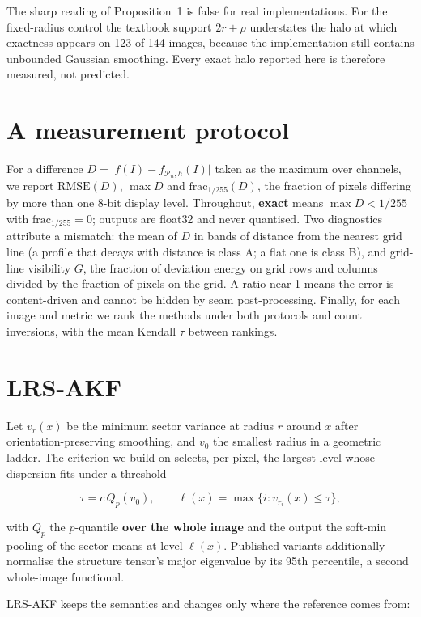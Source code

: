 \documentclass[journal]{IEEEtran}
\begin{document}
The sharp reading of Proposition~1 is false for real implementations. For the fixed-radius control the textbook support \(2r+\rho\) understates the halo at which exactness appears on 123 of 144 images, because the implementation still contains unbounded Gaussian smoothing. Every exact halo reported here is therefore measured, not predicted.

\section{A measurement protocol}\label{sec:measure}

For a difference \(D=\lvert f(I)-f_{\mathcal P_n,h}(I)\rvert\) taken as the maximum over channels, we report \(\mathrm{RMSE}(D)\), \(\max D\) and \(\mathrm{frac}_{1/255}(D)\), the fraction of pixels differing by more than one 8-bit display level. Throughout, \textbf{exact} means \(\max D<1/255\) with \(\mathrm{frac}_{1/255}=0\); outputs are float32 and never quantised. Two diagnostics attribute a mismatch: the mean of \(D\) in bands of distance from the nearest grid line (a profile that decays with distance is class A; a flat one is class B), and grid-line visibility \(G\), the fraction of deviation energy on grid rows and columns divided by the fraction of pixels on the grid. A ratio near 1 means the error is content-driven and cannot be hidden by seam post-processing. Finally, for each image and metric we rank the methods under both protocols and count inversions, with the mean Kendall \(\tau\) between rankings.

\section{LRS-AKF}\label{sec:method}

Let \(v_r(x)\) be the minimum sector variance at radius \(r\) around \(x\) after orientation-preserving smoothing, and \(v_0\) the smallest radius in a geometric ladder. The criterion we build on selects, per pixel, the largest level whose dispersion fits under a threshold

\[\tau = c\,Q_p(v_0),\qquad \ell(x)=\max\{i: v_{r_i}(x)\le\tau\},\]

with \(Q_p\) the \(p\)-quantile \textbf{over the whole image} and the output the soft-min pooling of the sector means at level \(\ell(x)\). Published variants additionally normalise the structure tensor's major eigenvalue by its 95th percentile, a second whole-image functional.

LRS-AKF keeps the semantics and changes only where the reference comes from:
\end{document}
